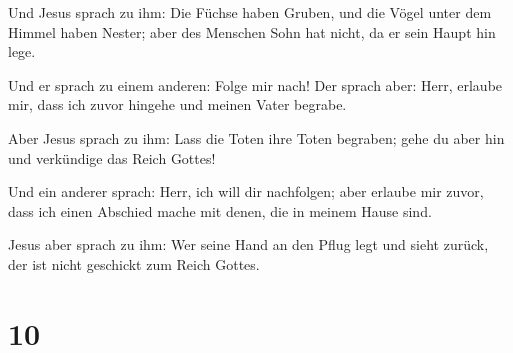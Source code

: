  Und Jesus sprach zu ihm: Die Füchse haben Gruben, und
die Vögel unter dem Himmel haben Nester; aber des Menschen Sohn hat
nicht, da er sein Haupt hin lege.

 Und er sprach zu einem anderen: Folge mir nach! Der
sprach aber: Herr, erlaube mir, dass ich zuvor hingehe und meinen Vater
begrabe.

 Aber Jesus sprach zu ihm: Lass die Toten ihre Toten
begraben; gehe du aber hin und verkündige das Reich Gottes!

 Und ein anderer sprach: Herr, ich will dir nachfolgen;
aber erlaube mir zuvor, dass ich einen Abschied mache mit denen, die in
meinem Hause sind.

 Jesus aber sprach zu ihm: Wer seine Hand an den Pflug
legt und sieht zurück, der ist nicht geschickt zum Reich Gottes.

\hypertarget{section-9}{%
\section{10}\label{section-9}}

